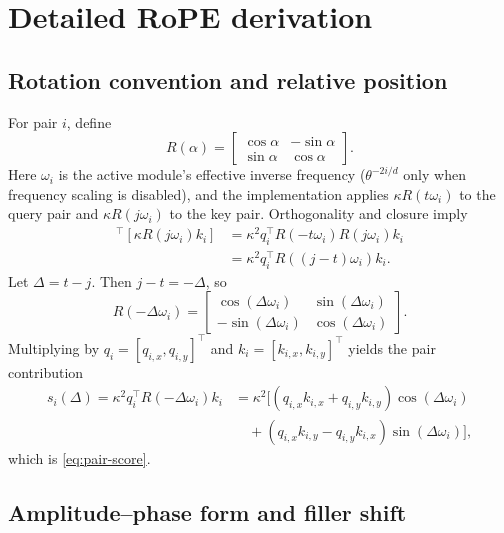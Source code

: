 \section{Detailed RoPE derivation}
\label{app:rope-proof}

\subsection{Rotation convention and relative position}

For pair $i$, define
\begin{equation}
  R(\alpha)=
  \begin{bmatrix}
    \cos\alpha&-\sin\alpha\\
    \sin\alpha&\cos\alpha
  \end{bmatrix}.
\end{equation}
Here $\omega_i$ is the active module's effective inverse frequency
($\theta^{-2i/d}$ only when frequency scaling is disabled), and the
implementation applies $\kappa R(t\omega_i)$ to the query pair and
$\kappa R(j\omega_i)$ to the key pair.  Orthogonality and closure imply
\begin{align}
  [\kappa R(t\omega_i)q_i]^\top[\kappa R(j\omega_i)k_i]
  &=\kappa^2q_i^\top R(-t\omega_i)R(j\omega_i)k_i\\
  &=\kappa^2q_i^\top R((j-t)\omega_i)k_i.
\end{align}
Let $\Delta=t-j$.  Then $j-t=-\Delta$, so
\begin{equation}
  R(-\Delta\omega_i)=
  \begin{bmatrix}
    \cos(\Delta\omega_i)&\sin(\Delta\omega_i)\\
    -\sin(\Delta\omega_i)&\cos(\Delta\omega_i)
  \end{bmatrix}.
\end{equation}
Multiplying by $q_i=[q_{i,x},q_{i,y}]^\top$ and
$k_i=[k_{i,x},k_{i,y}]^\top$ yields the pair contribution
\begin{align}
  s_i(\Delta)=\kappa^2q_i^\top R(-\Delta\omega_i)k_i
  &=\kappa^2\big[(q_{i,x}k_{i,x}+q_{i,y}k_{i,y})\cos(\Delta\omega_i)\\
  &\quad +(q_{i,x}k_{i,y}-q_{i,y}k_{i,x})\sin(\Delta\omega_i)\big],
\end{align}
which is \cref{eq:pair-score}.

\subsection{Amplitude--phase form and filler shift}

